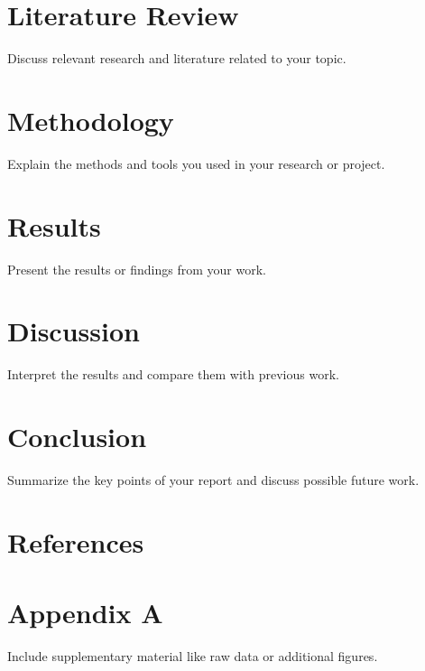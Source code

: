 \documentclass[12pt,a4paper]{report}
\begin{document}
	\chapter{Literature Review}
	Discuss relevant research and literature related to your topic.
	
	\chapter{Methodology}
	Explain the methods and tools you used in your research or project.
	
	\chapter{Results}
	Present the results or findings from your work.
	
	\chapter{Discussion}
	Interpret the results and compare them with previous work.
	
	\chapter{Conclusion}
	Summarize the key points of your report and discuss possible future work.
	
	\chapter*{References}
	
	
	\appendix
	\chapter{Appendix A}
	Include supplementary material like raw data or additional figures.
	
\end{document}

